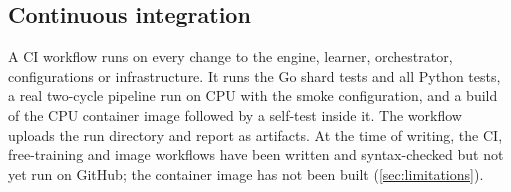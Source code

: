 \subsection{Continuous integration}
\label{sec:infra-ci}

A CI workflow runs on every change to the engine, learner, orchestrator, configurations or
infrastructure. It runs the Go shard tests and all Python tests, a real two-cycle pipeline
run on CPU with the smoke configuration, and a build of the CPU container image followed by
a self-test inside it. The workflow uploads the run directory and report as artifacts. At
the time of writing, the CI, free-training and image workflows have been written and
syntax-checked but not yet run on GitHub; the container image has not been built
(\cref{sec:limitations}).
